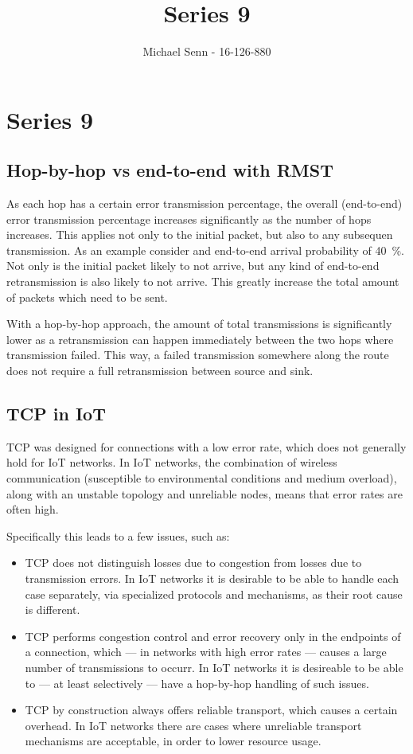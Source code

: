\documentclass[a4paper]{scrreprt}
\title{Series 9}
\author{Michael Senn \maillink{michael.senn@students.unibe.ch} - 16-126-880}
\date{\printdate}
\begin{document}
\maketitle


\setcounter{chapter}{8}

\chapter{Series 9}

\section{Hop-by-hop vs end-to-end with RMST}

As each hop has a certain error transmission percentage, the overall
(end-to-end) error transmission percentage increases significantly as the
number of hops increases. This applies not only to the initial packet, but also
to any subsequen transmission. As an example consider and end-to-end arrival
probability of \SI{40}{\percent}. Not only is the initial packet likely to not
arrive, but any kind of end-to-end retransmission is also likely to not arrive.
This greatly increase the total amount of packets which need to be sent.

With a hop-by-hop approach, the amount of total transmissions is significantly
lower as a retransmission can happen immediately between the two hops where
transmission failed. This way, a failed transmission somewhere along the route
does not require a full retransmission between source and sink.

\section{TCP in IoT}

TCP was designed for connections with a low error rate, which does not
generally hold for IoT networks. In IoT networks, the combination of wireless
communication (susceptible to environmental conditions and medium overload),
along with an unstable topology and unreliable nodes, means that error rates
are often high.

Specifically this leads to a few issues, such as:
\begin{itemize}
		\item TCP does not distinguish losses due to congestion from losses due
				to transmission errors. In IoT networks it is desirable to be
				able to handle each case separately, via specialized protocols
				and mechanisms, as their root cause is different.
		\item TCP performs congestion control and error recovery only in the
				endpoints of a connection, which --- in networks with high
				error rates --- causes a large number of transmissions to
				occurr. In IoT networks it is desireable to be able to --- at
				least selectively --- have a hop-by-hop handling of such
				issues.
		\item TCP by construction always offers reliable transport, which
				causes a certain overhead. In IoT networks there are cases
				where unreliable transport mechanisms are acceptable, in order
				to lower resource usage.
\end{itemize}
\end{document}
